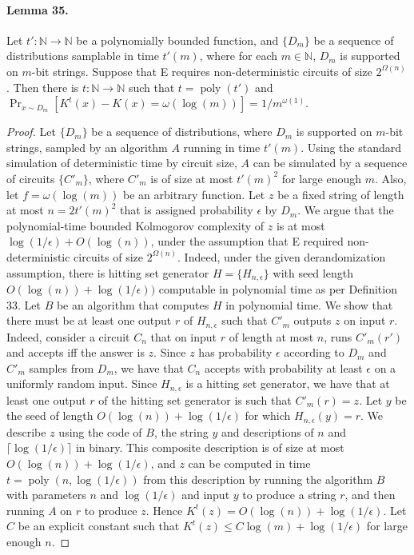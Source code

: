 \documentclass[10pt,a4paper]{article}
\begin{document}
\paragraph{Lemma 35.} Let $t':\mathbb N\to\mathbb N$ be a polynomially bounded function, and $\{D_m\}$ be a sequence of distributions samplable in time $t'(m)$, where for each $m\in\mathbb N$, $D_m$ is supported on $m$-bit strings. Suppose that E requires non-deterministic circuits of size $2^{\Omega(n)}$. Then there is $t:\mathbb N\to\mathbb N$ such that $t=\operatorname{poly}(t')$ and $\Pr_{x\sim D_m}[K^t(x)-K(x)=\omega(\log(m))]=1/m^{\omega(1)}$.
\begin{proof}Let $\{D_m\}$ be a sequence of distributions, where $D_m$ is supported on $m$-bit strings, sampled by an algorithm $A$ running in time $t'(m)$. Using the standard simulation of deterministic time by circuit size, $A$ can be simulated by a sequence of circuits $\{C'_m\}$, where $C'_m$ is of size at most $t'(m)^2$ for large enough $m$. Also, let $f=\omega(\log(m))$ be an arbitrary function.
Let $z$ be a fixed string of length at most $n=2t'(m)^2$ that is assigned probability $\epsilon$ by $D_m$. We argue that the polynomial-time bounded Kolmogorov complexity of $z$ is at most $\log(1/\epsilon)+O(\log(n))$, under the assumption that E required non-deterministic circuits of size $2^{\Omega(n)}$. Indeed, under the given derandomization assumption, there is hitting set generator $H=\{H_{n,\epsilon}\}$ with seed length $O(\log(n))+\log(1/\epsilon))$ computable in polynomial time as per Definition 33. Let $B$ be an algorithm that computes $H$ in polynomial time.
We show that there must be at least one output $r$ of $H_{n,\epsilon}$ such that $C'_m$ outputs $z$ on input $r$. Indeed, consider a circuit $C_n$ that on input $r$ of length at most $n$, runs $C'_m(r')$ and accepts iff the answer is $z$. Since $z$ has probability $\epsilon$ according to $D_m$ and $C'_m$ samples from $D_m$, we have that $C_n$ accepts with probability at least $\epsilon$ on a uniformly random input. Since $H_{n,\epsilon}$ is a hitting set generator, we have that at least one output $r$ of the hitting set generator is such that $C'_m(r)=z$.
Let $y$ be the seed of length $O(\log(n))+\log(1/\epsilon)$ for which $H_{n,\epsilon}(y)=r$. We describe $z$ using the code of $B$, the string $y$ and descriptions of $n$ and $\lceil\log(1/\epsilon)\rceil$ in binary. This composite description is of size at most $O(\log(n))+\log(1/\epsilon)$, and $z$ can be computed in time $t=\operatorname{poly}(n,\log(1/\epsilon))$ from this description by running the algorithm $B$ with parameters $n$ and $\log(1/\epsilon)$ and input $y$ to produce a string $r$, and then running $A$ on $r$ to produce $z$. Hence $K^t(z)=O(\log(n))+\log(1/\epsilon)$. Let $C$ be an explicit constant such that $K^t(z)\le C\log(m)+\log(1/\epsilon)$ for large enough $n$.

\end{proof}
\end{document}
